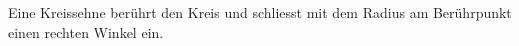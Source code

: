 
Eine Kreissehne berührt den Kreis und schliesst mit dem Radius am Berührpunkt einen rechten Winkel ein.
